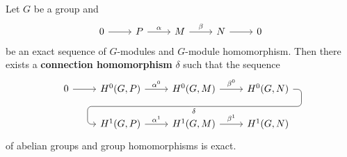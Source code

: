 \begin{theorem}
Let $G$ be a group and 
\[
\begin{tikzcd}
    0 & P & M & N & 0
    \arrow[from=1-1, to=1-2]
    \arrow["\alpha", from=1-2, to=1-3]
    \arrow["\beta", from=1-3, to=1-4]
    \arrow[from=1-4, to=1-5]
    \end{tikzcd}
\] 
be an exact sequence of $G$-modules and $G$-module homomorphism. 
Then there exists a \textbf{connection homomorphism} $\delta$ such that the sequence 
\begin{equation}
\label{eq:long}
\begin{tikzcd}
 0\rar & H^0(G,P)\rar["\alpha^0"] & H^0(G,M) \rar["\beta^0"]
             \ar[draw=none]{d}[name=X, anchor=center]{}
    & H^0(G,N) \ar[rounded corners,
            to path={ -- ([xshift=2ex]\tikztostart.east)
                      |- (X.center) \tikztonodes
                      -| ([xshift=-2ex]\tikztotarget.west)
                      -- (\tikztotarget)}]{dll}[at end]{\delta} \\      
  &H^1(G,P) \rar["\alpha^1"] & H^1(G,M) \rar["\beta^1"] & H^1(G,N)
\end{tikzcd}
\end{equation}
of abelian groups
and group homomorphisms is exact. 
\end{theorem}

